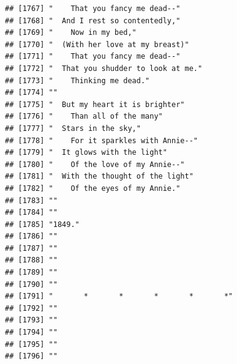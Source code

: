 \documentclass{article}\usepackage[]{graphicx}\usepackage[]{color}
\makeatletter
\newenvironment{kframe}{%
 \def\at@end@of@kframe{}%
 \ifinner\ifhmode%
  \def\at@end@of@kframe{\end{minipage}}%
  \begin{minipage}{\columnwidth}%
 \fi\fi%
 \def\FrameCommand##1{\hskip\@totalleftmargin \hskip-\fboxsep
 \colorbox{shadecolor}{##1}\hskip-\fboxsep
     \hskip-\linewidth \hskip-\@totalleftmargin \hskip\columnwidth}%
 \MakeFramed {\advance\hsize-\width
   \@totalleftmargin\z@ \linewidth\hsize
   \@setminipage}}%
 {\par\unskip\endMakeFramed%
 \at@end@of@kframe}
\newenvironment{knitrout}{}{} %
\makeatother
\begin{document}
\begin{knitrout}
\begin{kframe}
\begin{verbatim}
## [1767] "    That you fancy me dead--"                                                
## [1768] "  And I rest so contentedly,"                                                
## [1769] "    Now in my bed,"                                                          
## [1770] "  (With her love at my breast)"                                              
## [1771] "    That you fancy me dead--"                                                
## [1772] "  That you shudder to look at me."                                           
## [1773] "    Thinking me dead."                                                       
## [1774] ""                                                                            
## [1775] "  But my heart it is brighter"                                               
## [1776] "    Than all of the many"                                                    
## [1777] "  Stars in the sky,"                                                         
## [1778] "    For it sparkles with Annie--"                                            
## [1779] "  It glows with the light"                                                   
## [1780] "    Of the love of my Annie--"                                               
## [1781] "  With the thought of the light"                                             
## [1782] "    Of the eyes of my Annie."                                                
## [1783] ""                                                                            
## [1784] ""                                                                            
## [1785] "1849."                                                                       
## [1786] ""                                                                            
## [1787] ""                                                                            
## [1788] ""                                                                            
## [1789] ""                                                                            
## [1790] ""                                                                            
## [1791] "       *       *       *       *       *"                                    
## [1792] ""                                                                            
## [1793] ""                                                                            
## [1794] ""                                                                            
## [1795] ""                                                                            
## [1796] ""                                                                            

\end{verbatim}
\end{kframe}
\end{knitrout}
\end{document}
